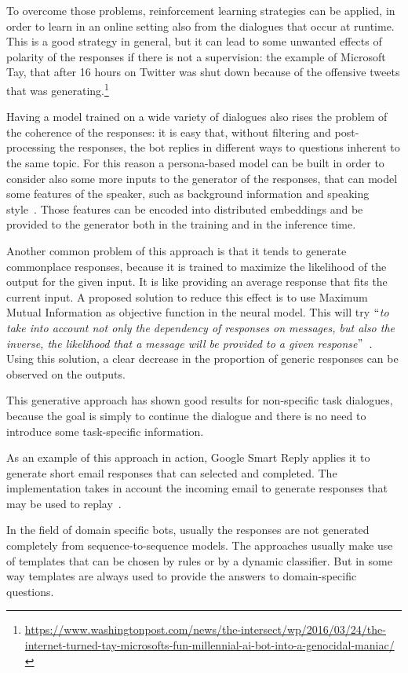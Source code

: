 To overcome those problems, reinforcement learning strategies can be applied, in order to learn in an online setting also from the dialogues that occur at runtime. This is a good strategy in general, but it can lead to some unwanted effects of polarity of the responses if there is not a supervision: the example of Microsoft Tay, that after 16 hours on Twitter was shut down because of the offensive tweets that was generating.\footnote{\url{https://www.washingtonpost.com/news/the-intersect/wp/2016/03/24/the-internet-turned-tay-microsofts-fun-millennial-ai-bot-into-a-genocidal-maniac/}}

Having a model trained on a wide variety of dialogues also rises the problem of the coherence of the responses: it is easy that, without filtering and post-processing the responses, the bot replies in different ways to questions inherent to the same topic. For this reason a persona-based model can be built in order to consider also some more inputs to the generator of the responses, that can model some features of the speaker, such as background information and speaking style~\cite{li2016persona}. Those features can be encoded into distributed embeddings and be provided to the generator both in the training and in the inference time.

Another common problem of this approach is that it tends to generate commonplace responses, because it is trained to maximize the likelihood of the output for the given input. It is like providing an average response that fits the current input. A proposed solution to reduce this effect is to use Maximum Mutual Information as objective function in the neural model. This will try $``$\textit{to take into account not only the dependency of responses on messages, but also the inverse, the likelihood that a message will be provided to a given response}$"$~\cite{li2015diversity}. Using this solution, a clear decrease in the proportion of generic responses can be observed on the outputs.

This generative approach has shown good results for non-specific task dialogues, because the goal is simply to continue the dialogue and there is no need to introduce some task-specific information.

As an example of this approach in action, Google Smart Reply applies it to generate short email responses that can selected and completed. The implementation takes in account the incoming email to generate responses that may be used to replay~\cite{kannan2016smart}.

In the field of domain specific bots, usually the responses are not generated completely from sequence-to-sequence models. The approaches usually make use of templates that can be chosen by rules or by a dynamic classifier. But in some way templates are always used to provide the answers to domain-specific questions.

